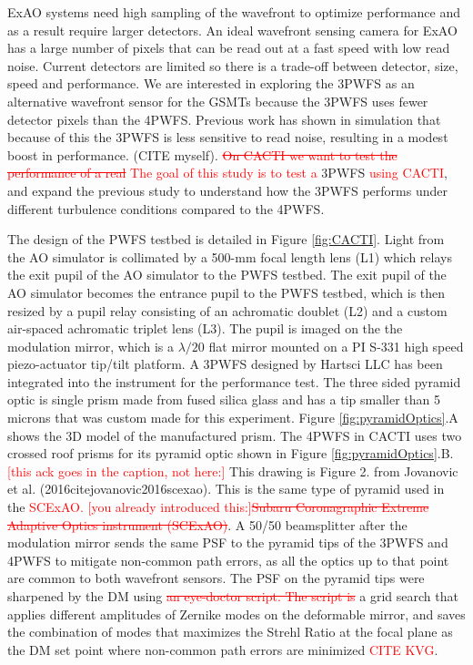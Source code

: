 \documentclass[12pt]{spieman}  %
\newcommand{\jrmadd}[1]{\textcolor{red}{#1}}
\newcommand{\jrmrmv}[1]{\textcolor{red}{\sout{#1}}}
\newcommand{\jrmcom}[1]{\textcolor{red}{[#1]}}
\begin{document}
\begin{spacing}{2}
ExAO systems need high sampling of the wavefront to optimize performance and as a result require larger detectors. An ideal wavefront sensing camera for ExAO has a large number of pixels that can be read out at a fast speed with low read noise. Current detectors are limited so there is a trade-off between detector, size, speed and performance. We are interested in exploring the 3PWFS as an alternative wavefront sensor for the GSMTs because the 3PWFS uses fewer detector pixels than the 4PWFS. Previous work has shown in simulation that because of this the 3PWFS is less sensitive to read noise, resulting in a modest boost in performance. (CITE myself). \jrmrmv{On CACTI we want to test the performance of a real} \jrmadd{The goal of this study is to test a} 3PWFS \jrmadd{using CACTI}, and expand the previous study to understand how the 3PWFS performs under different turbulence conditions compared to the 4PWFS. 

The design of the PWFS testbed is detailed in Figure \ref{fig:CACTI}. Light from the AO simulator is collimated by a 500-mm focal length lens (L1) which relays the exit pupil of the AO simulator to the PWFS testbed. The exit pupil of the AO simulator becomes the entrance pupil to the PWFS testbed, which is then resized by a pupil relay consisting of an achromatic doublet (L2) and a custom air-spaced achromatic triplet lens (L3). The pupil is imaged on the the modulation mirror, which is a $\lambda/20$ flat mirror mounted on a PI S-331 high speed piezo-actuator tip/tilt platform. A 3PWFS designed by Hartsci LLC has been integrated into the instrument for the performance test. The three sided pyramid optic is single prism made from fused silica glass and has a tip smaller than 5 microns that was custom made for this experiment. Figure \ref{fig:pyramidOptics}.A shows the 3D model of the manufactured prism. The 4PWFS in CACTI uses two crossed roof prisms for its pyramid optic shown in Figure \ref{fig:pyramidOptics}.B. \jrmcom{this ack goes in the caption, not here:} This drawing is Figure 2. from Jovanovic et al. (2016cite{jovanovic2016scexao}). This is the same type of pyramid used in the \jrmadd{SCExAO.} \jrmcom{you already introduced this:}\jrmrmv{Subaru Coronagraphic Extreme Adaptive Optics instrument (SCExAO)\cite{jovanovic2015subaru}}.  A 50/50 beamsplitter after the modulation mirror sends the same PSF to the pyramid tips of the 3PWFS and 4PWFS to mitigate non-common path errors, as all the optics up to that point are common to both wavefront sensors. The PSF on the pyramid tips were sharpened by the DM using \jrmrmv{an eye-doctor script. The script is} a grid search that applies different amplitudes of Zernike modes on the deformable mirror, and saves the combination of modes that maximizes the Strehl Ratio at the focal plane as the  DM set point where non-common path errors are minimized \jrmadd{CITE KVG}.


\end{spacing}
\end{document}
